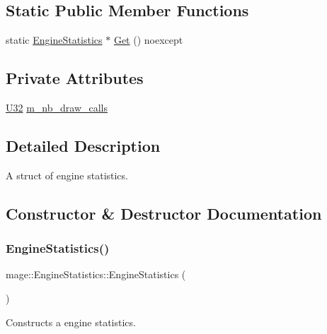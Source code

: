 \subsection*{Static Public Member Functions}
\begin{DoxyCompactItemize}
\item 
static \hyperlink{structmage_1_1_engine_statistics}{Engine\+Statistics} $\ast$ \hyperlink{structmage_1_1_engine_statistics_a7eb0d3a988676f71eea8e9f26ab07f42}{Get} () noexcept
\end{DoxyCompactItemize}
\subsection*{Private Attributes}
\begin{DoxyCompactItemize}
\item 
\hyperlink{namespacemage_a41c104c036fba3756a74e19f793eeaa1}{U32} \hyperlink{structmage_1_1_engine_statistics_a26eeba872cebff2657b8b023751b1894}{m\+\_\+nb\+\_\+draw\+\_\+calls}
\end{DoxyCompactItemize}


\subsection{Detailed Description}
A struct of engine statistics. 

\subsection{Constructor \& Destructor Documentation}
\hypertarget{structmage_1_1_engine_statistics_acbaa39e0e0ee0d6cb5c8d174bb80a3fd}{}\label{structmage_1_1_engine_statistics_acbaa39e0e0ee0d6cb5c8d174bb80a3fd} 
\subsubsection{\texorpdfstring{Engine\+Statistics()}{EngineStatistics()}\hspace{0.1cm}{\footnotesize\ttfamily [1/3]}}
{\footnotesize\ttfamily mage\+::\+Engine\+Statistics\+::\+Engine\+Statistics (\begin{DoxyParamCaption}{ }\end{DoxyParamCaption})}

Constructs a engine statistics. \hypertarget{structmage_1_1_engine_statistics_a8361fa991298c7669b4e3c8262acff60}{}\label{structmage_1_1_engine_statistics_a8361fa991298c7669b4e3c8262acff60} 
